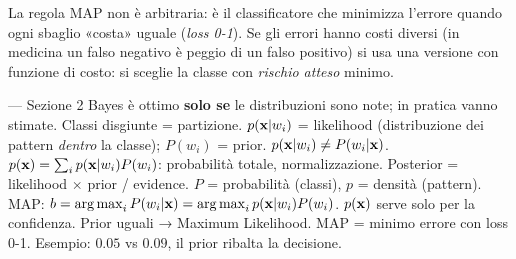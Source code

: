 \begin{mlbox}
La regola MAP non è arbitraria: è il classificatore che minimizza l'errore quando ogni sbaglio «costa» uguale (\emph{loss 0-1}). Se gli errori hanno costi diversi (in medicina un falso negativo è peggio di un falso positivo) si usa una versione con funzione di costo: si sceglie la classe con \emph{rischio atteso} minimo.
\end{mlbox}

\begin{appunti}{— Sezione 2}
 Bayes è ottimo \textbf{solo se} le distribuzioni sono note; in pratica vanno stimate. Classi disgiunte = partizione. $p(\mathbf{x}|w_i)$ = likelihood (distribuzione dei pattern \emph{dentro} la classe); $P(w_i)$ = prior. $p(\mathbf{x}|w_i)\neq P(w_i|\mathbf{x})$.
 $p(\mathbf{x})=\sum_i p(\mathbf{x}|w_i)P(w_i)$: probabilità totale, normalizzazione. Posterior = likelihood $\times$ prior / evidence. $P$ = probabilità (classi), $p$ = densità (pattern).
 MAP: $b=\operatorname*{arg\,max}_i P(w_i|\mathbf{x})=\operatorname*{arg\,max}_i p(\mathbf{x}|w_i)P(w_i)$. $p(\mathbf{x})$ serve solo per la confidenza. Prior uguali → Maximum Likelihood. MAP = minimo errore con loss 0-1. Esempio: $0.05$ vs $0.09$, il prior ribalta la decisione.
\end{appunti}
